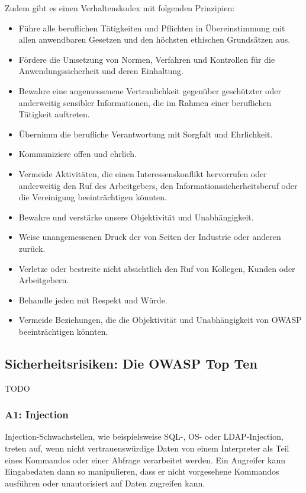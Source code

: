 \documentclass[12pt,oneside,a4paper,parskip]{scrbook}
\begin{document}
Zudem gibt es einen Verhaltenskodex mit folgenden Prinzipien:
\begin{itemize}
  \item Führe alle beruflichen Tätigkeiten und Pflichten in Übereinstimmung mit allen anwendbaren Gesetzen und den höchsten ethischen Grundsätzen aus.
  \item Fördere die Umsetzung von Normen, Verfahren und Kontrollen für die Anwendungssicherheit und deren Einhaltung.
  \item Bewahre eine angemessenene Vertraulichkeit gegenüber geschützter oder anderweitig sensibler Informationen, die im Rahmen einer beruflichen Tätigkeit auftreten.
  \item Übernimm die berufliche Verantwortung mit Sorgfalt und Ehrlichkeit.
  \item Kommuniziere offen und ehrlich.
  \item Vermeide Aktivitäten, die einen Interessenskonflikt hervorrufen oder anderweitig den Ruf des Arbeitgebers, den Informationssicherheitsberuf oder die Vereinigung beeinträchtigen könnten.
  \item Bewahre und verstärke unsere Objektivität und Unabhängigkeit.
  \item Weise unangemessenen Druck der von Seiten der Industrie oder anderen zurück.
  \item Verletze oder bestreite nicht absichtlich den Ruf von Kollegen, Kunden oder Arbeitgebern.
  \item Behandle jeden mit Respekt und Würde.
  \item Vermeide Beziehungen, die die Objektivität und Unabhängigkeit von OWASP  beeinträchtigen könnten.
\end{itemize}

\cite{OWASPabout}

\subsection{Sicherheitsrisiken: Die OWASP Top Ten}
TODO
\cite{OWASPtop10}

\subsubsection{A1: Injection}
Injection-Schwachstellen, wie beispielsweise SQL-, OS- oder LDAP-Injection, treten auf, wenn
nicht vertrauenswürdige Daten von einem Interpreter als Teil eines Kommandos oder einer
Abfrage verarbeitet werden. Ein Angreifer kann Eingabedaten dann so manipulieren, dass er nicht
vorgesehene Kommandos ausführen oder unautorisiert auf Daten zugreifen kann.
\end{document}
